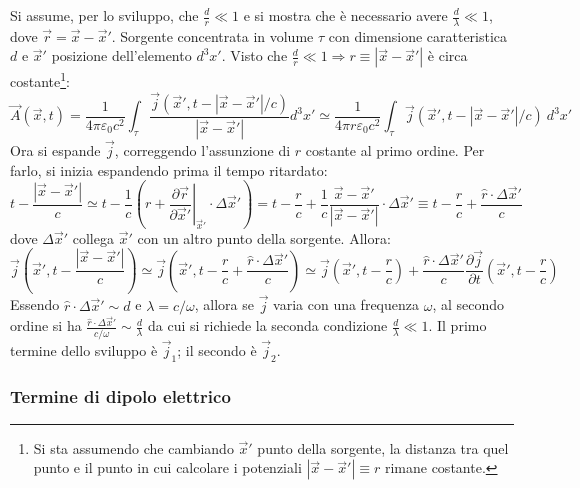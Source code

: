 \documentclass[10pt, a4paper]{scrartcl}
\newcommand*\Eval[3]{\left.#1\right\rvert_{#2}^{#3}}
\numberwithin{equation}{subsection}
\theoremstyle{style1}
\begin{document}
Si assume, per lo sviluppo, che $\frac{d}{r}\ll 1$ e si mostra che \`e necessario avere $\frac{d}{\lambda }\ll 1$, dove $\vec{r}=\vec{x}-\vec{x}'$. Sorgente concentrata in volume $\tau $ con dimensione caratteristica $d$ e $\vec{x}'$ posizione dell'elemento $d^3x' $. Visto che $\frac{d}{r}\ll 1\Rightarrow r \equiv\left\lvert \vec{x}-\vec{x}' \right\rvert$ \`e circa costante\footnote{Si sta assumendo che cambiando $\vec{x}'$ punto della sorgente, la distanza tra quel punto e il punto in cui calcolare i potenziali $\left\lvert \vec{x}-\vec{x}' \right\rvert \equiv r$ rimane costante.}:
\[
\vec{A}(\vec{x},t) = \frac{1}{4\pi \varepsilon _0 c^2}\int_{\tau } \frac{\vec{j}(\vec{x}',t - \left\lvert \vec{x}-\vec{x}' \right\rvert / c)}{\left\lvert \vec{x}-\vec{x}' \right\rvert }d^3 x' \simeq\frac{1}{4\pi r \varepsilon _0 c^2}\int_{\tau } \vec{j}(\vec{x}',t - \left\lvert \vec{x}-\vec{x}' \right\rvert / c)\ d^3 x' 
\] 
Ora si espande $\vec{j}$, correggendo l'assunzione di $r$ costante al primo ordine. Per farlo, si inizia espandendo prima il tempo ritardato:
\begin{equation*}
t - \frac{\left\lvert \vec{x}-\vec{x}' \right\rvert }{c}\simeq t - \frac{1}{c} \left(r+ \Eval{\frac{\partial \vec{r}}{\partial \vec{x}'} }{\vec{x}'}{}\cdot \Delta \vec{x}'\right) = t-\frac{r}{c} + \frac{1}{c} \frac{\vec{x}-\vec{x}'}{\left\lvert \vec{x}-\vec{x}' \right\rvert }\cdot \Delta \vec{x}'\equiv t - \frac{r}{c} + \frac{\hat{r}\cdot \Delta \vec{x}'}{c}
\end{equation*}
dove $\Delta \vec{x}'$ collega $\vec{x}'$ con un altro punto della sorgente. Allora:
\begin{equation*}
	\vec{j}\left(\vec{x}', t- \frac{\left\lvert \vec{x}-\vec{x}' \right\rvert }{c}\right) \simeq\vec{j}\left(\vec{x}', t - \frac{r}{c} + \frac{\hat{r}\cdot \Delta \vec{x}'}{c}\right) \simeq \vec{j}\left(\vec{x}', t- \frac{r}{c}\right) + \frac{\hat{r}\cdot \Delta \vec{x}'}{c} \frac{\partial \vec{j}}{\partial t} \left(\vec{x}', t- \frac{r}{c}\right) 
\end{equation*}
Essendo $\hat{r}\cdot \Delta \vec{x}'\sim d$ e $\lambda = c / \omega$, allora se $\vec{j}$ varia con una frequenza $\omega$, al secondo ordine si ha $\frac{\hat{r}\cdot \Delta \vec{x}'}{c / \omega}\sim \frac{d}{\lambda }$ da cui si richiede la seconda condizione $\frac{d}{\lambda }\ll 1$. Il primo termine dello sviluppo \`e $\vec{j}_1$; il secondo \`e $\vec{j}_2$.
\subsubsection{Termine di dipolo elettrico}
\end{document}
